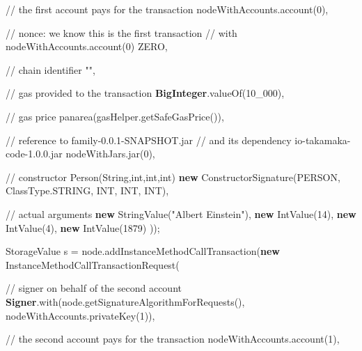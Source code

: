 \documentclass[a4paper,]{book}
\newenvironment{Shaded}{\begin{snugshade}}{\end{snugshade}}
\newcommand{\BuiltInTok}[1]{\textcolor[rgb]{0.39,0.29,0.61}{\textbf{#1}}}
\newcommand{\CommentTok}[1]{\textcolor[rgb]{0.54,0.53,0.53}{#1}}
\newcommand{\DecValTok}[1]{\textcolor[rgb]{0.69,0.50,0.00}{#1}}
\newcommand{\FunctionTok}[1]{\textcolor[rgb]{0.39,0.29,0.61}{#1}}
\newcommand{\KeywordTok}[1]{\textcolor[rgb]{0.12,0.11,0.11}{\textbf{#1}}}
\newcommand{\NormalTok}[1]{\textcolor[rgb]{0.12,0.11,0.11}{#1}}
\newcommand{\StringTok}[1]{\textcolor[rgb]{0.75,0.01,0.01}{#1}}
\renewenvironment{Shaded}{\begin{snugshade}\small}{\end{snugshade}}
\begin{document}
{\begin{Shaded}
\begin{Highlighting}[]
          \CommentTok{// the first account pays for the transaction}
\NormalTok{          nodeWithAccounts.}\FunctionTok{account}\NormalTok{(}\DecValTok{0}\NormalTok{),}

          \CommentTok{// nonce: we know this is the first transaction}
          \CommentTok{// with nodeWithAccounts.account(0)}
\NormalTok{          ZERO,}

          \CommentTok{// chain identifier}
          \StringTok{""}\NormalTok{,}

          \CommentTok{// gas provided to the transaction}
          \BuiltInTok{BigInteger}\NormalTok{.}\FunctionTok{valueOf}\NormalTok{(}\DecValTok{10_000}\NormalTok{),}

          \CommentTok{// gas price}
          \FunctionTok{panarea}\NormalTok{(gasHelper.}\FunctionTok{getSafeGasPrice}\NormalTok{()),}

          \CommentTok{// reference to family-0.0.1-SNAPSHOT.jar}
          \CommentTok{// and its dependency io-takamaka-code-1.0.0.jar}
\NormalTok{          nodeWithJars.}\FunctionTok{jar}\NormalTok{(}\DecValTok{0}\NormalTok{),}

          \CommentTok{// constructor Person(String,int,int,int)}
          \KeywordTok{new} \FunctionTok{ConstructorSignature}\NormalTok{(PERSON, ClassType.}\FunctionTok{STRING}\NormalTok{, INT, INT, INT),}

          \CommentTok{// actual arguments}
          \KeywordTok{new} \FunctionTok{StringValue}\NormalTok{(}\StringTok{"Albert Einstein"}\NormalTok{), }\KeywordTok{new} \FunctionTok{IntValue}\NormalTok{(}\DecValTok{14}\NormalTok{),}
          \KeywordTok{new} \FunctionTok{IntValue}\NormalTok{(}\DecValTok{4}\NormalTok{), }\KeywordTok{new} \FunctionTok{IntValue}\NormalTok{(}\DecValTok{1879}\NormalTok{)}
\NormalTok{      ));}

\NormalTok{      StorageValue s = node.}\FunctionTok{addInstanceMethodCallTransaction}\NormalTok{(}\KeywordTok{new} \FunctionTok{InstanceMethodCallTransactionRequest}\NormalTok{(}

        \CommentTok{// signer on behalf of the second account}
        \BuiltInTok{Signer}\NormalTok{.}\FunctionTok{with}\NormalTok{(node.}\FunctionTok{getSignatureAlgorithmForRequests}\NormalTok{(), nodeWithAccounts.}\FunctionTok{privateKey}\NormalTok{(}\DecValTok{1}\NormalTok{)),}

        \CommentTok{// the second account pays for the transaction}
\NormalTok{        nodeWithAccounts.}\FunctionTok{account}\NormalTok{(}\DecValTok{1}\NormalTok{),}


\end{Highlighting}
\end{Shaded}}
\end{document}
